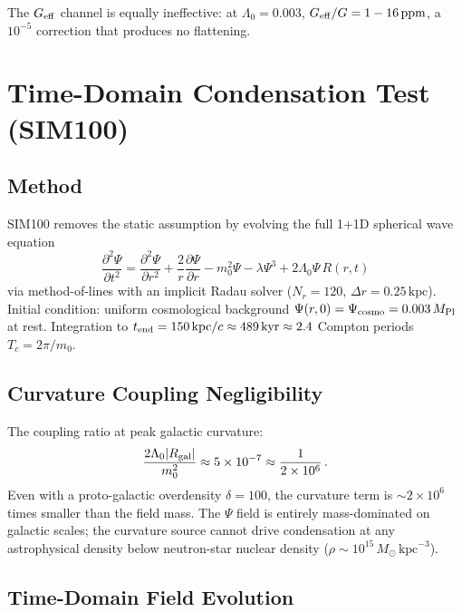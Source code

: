 \documentclass[12pt,a4paper]{article}
\newcommand{\Lz}{\Lambda_0}
\newcommand{\Mpl}{M_{\rm Pl}}
\theoremstyle{plain}
\begin{document}
The $G_{\rm eff}$ channel is equally ineffective: at $\Lz = 0.003$,
$G_{\rm eff}/G = 1 - 16\,\mathrm{ppm}$, a $10^{-5}$ correction that produces
no flattening.

\section{Time-Domain Condensation Test (SIM100)}
\label{sec:sim100}

\subsection{Method}

SIM100 removes the static assumption by evolving the full 1+1D spherical
wave equation
\begin{equation}
  \frac{\partial^2\Psi}{\partial t^2}
  = \frac{\partial^2\Psi}{\partial r^2}
  + \frac{2}{r}\frac{\partial\Psi}{\partial r}
  - m_0^2\Psi - \lambda\Psi^3
  + 2\Lz\Psi\,R(r,t)
  \label{eq:timedomain}
\end{equation}
via method-of-lines with an implicit Radau solver ($N_r = 120$,
$\Delta r = 0.25\,\mathrm{kpc}$). Initial condition: uniform cosmological
background $\Psi(r,0) = \Psi_{\rm cosmo} = 0.003\,\Mpl$ at rest.
Integration to $t_{\rm end} = 150\,\mathrm{kpc}/c \approx 489\,\mathrm{kyr}
\approx 2.4$ Compton periods $T_c = 2\pi/m_0$.

\subsection{Curvature Coupling Negligibility}

The coupling ratio at peak galactic curvature:
\begin{equation}
  \frac{2\Lz|R_{\rm gal}|}{m_0^2} \approx 5\times10^{-7} \approx \frac{1}{2\times10^6}\,.
\end{equation}
Even with a proto-galactic overdensity $\delta = 100$, the curvature
term is $\sim2\times10^6$ times smaller than the field mass. The $\Psi$ field
is entirely mass-dominated on galactic scales; the curvature source cannot
drive condensation at any astrophysical density below neutron-star nuclear
density ($\rho \sim 10^{15}\,M_\odot\,\mathrm{kpc}^{-3}$).

\subsection{Time-Domain Field Evolution}
\end{document}
